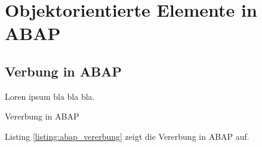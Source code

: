 \section{Objektorientierte Elemente in ABAP}

\subsection{Verbung in ABAP}
Loren ipsum bla bla bla.
\begin{listing}[ht]{}
  \caption{Vererbung in ABAP}
  \label{listing:abap_vererbung}
\end{listing}
\newline 
Listing \ref{listing:abap_vererbung} zeigt die Vererbung in ABAP auf.
